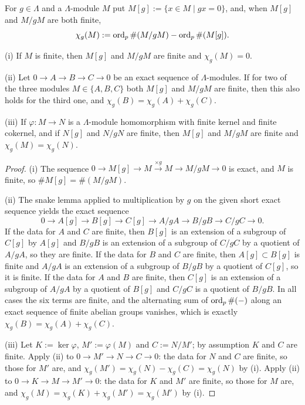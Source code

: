 \begin{lem}
\label{euler-char-lemma}
\leanok
For $g\in\Lambda$ and a $\Lambda$-module $M$ put
$M[g]:=\{x\in M\mid gx=0\}$, and, when $M[g]$ and $M/gM$ are both finite,
$$\chi_g(M):=\operatorname{ord}_p\#(M/gM)-\operatorname{ord}_p\#(M[g]).$$

{\rm(i)} If $M$ is finite, then $M[g]$ and $M/gM$ are finite and $\chi_g(M)=0$.

{\rm(ii)} Let $0\to A\to B\to C\to 0$ be an exact sequence of $\Lambda$-modules.
If for two of the three modules $M\in\{A,B,C\}$ both $M[g]$ and $M/gM$ are
finite, then this also holds for the third one, and
$\chi_g(B)=\chi_g(A)+\chi_g(C)$.

{\rm(iii)} If $\varphi:M\to N$ is a $\Lambda$-module homomorphism with finite
kernel and finite cokernel, and if $N[g]$ and $N/gN$ are finite, then $M[g]$ and
$M/gM$ are finite and $\chi_g(M)=\chi_g(N)$.
\end{lem}

\begin{proof}
\leanok
(i) The sequence $0\to M[g]\to M\xrightarrow{\times g}M\to M/gM\to 0$ is exact,
and $M$ is finite, so $\#M[g]=\#(M/gM)$.

(ii) The snake lemma applied to multiplication by $g$ on the given short exact
sequence yields the exact sequence
$$0\to A[g]\to B[g]\to C[g]\to A/gA\to B/gB\to C/gC\to 0 .$$
If the data for $A$ and $C$ are finite, then $B[g]$ is an extension of a subgroup
of $C[g]$ by $A[g]$ and $B/gB$ is an extension of a subgroup of $C/gC$ by a
quotient of $A/gA$, so they are finite.
If the data for $B$ and $C$ are finite, then $A[g]\subset B[g]$ is finite and
$A/gA$ is an extension of a subgroup of $B/gB$ by a quotient of $C[g]$, so it is
finite. If the data for $A$ and $B$ are finite, then $C[g]$ is an extension of a
subgroup of $A/gA$ by a quotient of $B[g]$ and $C/gC$ is a quotient of $B/gB$.
In all cases the six terms are finite, and the alternating sum of
$\operatorname{ord}_p\#(-)$ along an exact sequence of finite abelian groups vanishes, which is
exactly $\chi_g(B)=\chi_g(A)+\chi_g(C)$.

(iii) Let $K:=\ker\varphi$, $M':=\varphi(M)$ and $C:=N/M'$; by assumption $K$ and
$C$ are finite.
Apply (ii) to $0\to M'\to N\to C\to 0$: the data for $N$ and $C$ are finite, so
those for $M'$ are, and $\chi_g(M')=\chi_g(N)-\chi_g(C)=\chi_g(N)$ by (i).
Apply (ii) to $0\to K\to M\to M'\to 0$: the data for $K$ and $M'$ are finite, so
those for $M$ are, and $\chi_g(M)=\chi_g(K)+\chi_g(M')=\chi_g(M')$ by (i).
\end{proof}

